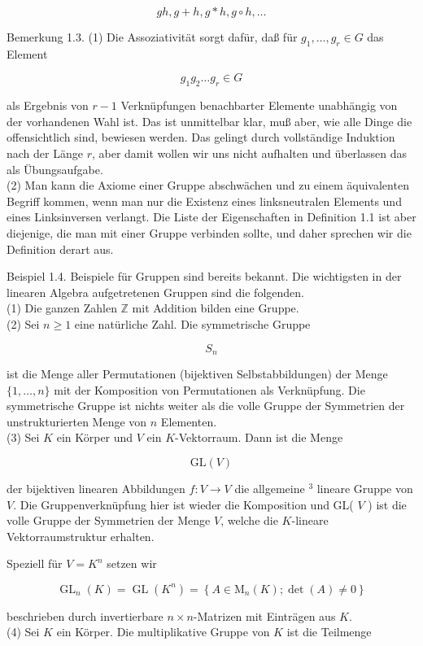\documentclass[10pt, letterpaper]{article}
\begin{document}
$$
g h, g+h, g * h, g \circ h, \ldots
$$

Bemerkung 1.3. (1) Die Assoziativität sorgt dafür, daß für $g_{1}, \ldots, g_{r} \in G$ das Element

$$
g_{1} g_{2} \ldots g_{r} \in G
$$

als Ergebnis von $r-1$ Verknüpfungen benachbarter Elemente unabhängig von der vorhandenen Wahl ist. Das ist unmittelbar klar, muß aber, wie alle Dinge die offensichtlich sind, bewiesen werden. Das gelingt durch vollständige Induktion nach der Länge $r$, aber damit wollen wir uns nicht aufhalten und überlassen das als Übungsaufgabe.\\
(2) Man kann die Axiome einer Gruppe abschwächen und zu einem äquivalenten Begriff kommen, wenn man nur die Existenz eines linksneutralen Elements und eines Linksinversen verlangt. Die Liste der Eigenschaften in Definition 1.1 ist aber diejenige, die man mit einer Gruppe verbinden sollte, und daher sprechen wir die Definition derart aus.

Beispiel 1.4. Beispiele für Gruppen sind bereits bekannt. Die wichtigsten in der linearen Algebra aufgetretenen Gruppen sind die folgenden.\\
(1) Die ganzen Zahlen $\mathbb{Z}$ mit Addition bilden eine Gruppe.\\
(2) Sei $n \geq 1$ eine natürliche Zahl. Die symmetrische Gruppe

$$
S_{n}
$$

ist die Menge aller Permutationen (bijektiven Selbstabbildungen) der Menge $\{1, \ldots, n\}$ mit der Komposition von Permutationen als Verknüpfung. Die symmetrische Gruppe ist nichts weiter als die volle Gruppe der Symmetrien der unstrukturierten Menge von $n$ Elementen.\\
(3) Sei $K$ ein Körper und $V$ ein $K$-Vektorraum. Dann ist die Menge

$$
\mathrm{GL}(V)
$$

der bijektiven linearen Abbildungen $f: V \rightarrow V$ die allgemeine ${ }^{3}$ lineare Gruppe von $V$. Die Gruppenverknüpfung hier ist wieder die Komposition und GL( $V$ ) ist die volle Gruppe der Symmetrien der Menge $V$, welche die $K$-lineare Vektorraumstruktur erhalten.

Speziell für $V=K^{n}$ setzen wir

$$
\operatorname{GL}_{n}(K)=\operatorname{GL}\left(K^{n}\right)=\left\{A \in \mathrm{M}_{n}(K) ; \operatorname{det}(A) \neq 0\right\}
$$

beschrieben durch invertierbare $n \times n$-Matrizen mit Einträgen aus $K$.\\
(4) Sei $K$ ein Körper. Die multiplikative Gruppe von $K$ ist die Teilmenge
\end{document}
